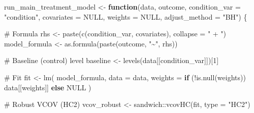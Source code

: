 \documentclass[
  letterpaper,
  DIV=11,
  numbers=noendperiod]{scrartcl}
\newenvironment{Shaded}{\begin{snugshade}}{\end{snugshade}}
\newcommand{\AttributeTok}[1]{\textcolor[rgb]{0.40,0.45,0.13}{#1}}
\newcommand{\CommentTok}[1]{\textcolor[rgb]{0.37,0.37,0.37}{#1}}
\newcommand{\ConstantTok}[1]{\textcolor[rgb]{0.56,0.35,0.01}{#1}}
\newcommand{\ControlFlowTok}[1]{\textcolor[rgb]{0.00,0.23,0.31}{\textbf{#1}}}
\newcommand{\DecValTok}[1]{\textcolor[rgb]{0.68,0.00,0.00}{#1}}
\newcommand{\FunctionTok}[1]{\textcolor[rgb]{0.28,0.35,0.67}{#1}}
\newcommand{\NormalTok}[1]{\textcolor[rgb]{0.00,0.23,0.31}{#1}}
\newcommand{\OtherTok}[1]{\textcolor[rgb]{0.00,0.23,0.31}{#1}}
\newcommand{\SpecialCharTok}[1]{\textcolor[rgb]{0.37,0.37,0.37}{#1}}
\newcommand{\StringTok}[1]{\textcolor[rgb]{0.13,0.47,0.30}{#1}}
\begin{document}
\begin{Shaded}
\begin{Highlighting}[]
\NormalTok{run\_main\_treatment\_model }\OtherTok{\textless{}{-}} \ControlFlowTok{function}\NormalTok{(data,}
\NormalTok{                                     outcome,}
                                     \AttributeTok{condition\_var =} \StringTok{"condition"}\NormalTok{,}
                                     \AttributeTok{covariates    =} \ConstantTok{NULL}\NormalTok{,}
                                     \AttributeTok{weights       =} \ConstantTok{NULL}\NormalTok{,}
                                     \AttributeTok{adjust\_method =} \StringTok{"BH"}\NormalTok{) \{}
  
  \CommentTok{\# Formula}
\NormalTok{  rhs           }\OtherTok{\textless{}{-}} \FunctionTok{paste}\NormalTok{(}\FunctionTok{c}\NormalTok{(condition\_var, covariates), }\AttributeTok{collapse =} \StringTok{" + "}\NormalTok{)}
\NormalTok{  model\_formula }\OtherTok{\textless{}{-}} \FunctionTok{as.formula}\NormalTok{(}\FunctionTok{paste}\NormalTok{(outcome, }\StringTok{"\textasciitilde{}"}\NormalTok{, rhs))}
  
  \CommentTok{\# Baseline (control) level}
\NormalTok{  baseline }\OtherTok{\textless{}{-}} \FunctionTok{levels}\NormalTok{(data[[condition\_var]])[}\DecValTok{1}\NormalTok{]}
  
  \CommentTok{\# Fit}
\NormalTok{  fit }\OtherTok{\textless{}{-}} \FunctionTok{lm}\NormalTok{(}
\NormalTok{    model\_formula,}
    \AttributeTok{data    =}\NormalTok{ data,}
    \AttributeTok{weights =} \ControlFlowTok{if}\NormalTok{ (}\SpecialCharTok{!}\FunctionTok{is.null}\NormalTok{(weights)) data[[weights]] }\ControlFlowTok{else} \ConstantTok{NULL}
\NormalTok{  )}
  
  \CommentTok{\# Robust VCOV (HC2)}
\NormalTok{  vcov\_robust }\OtherTok{\textless{}{-}}\NormalTok{ sandwich}\SpecialCharTok{::}\FunctionTok{vcovHC}\NormalTok{(fit, }\AttributeTok{type =} \StringTok{"HC2"}\NormalTok{)}
  

\end{Highlighting}
\end{Shaded}
\end{document}
